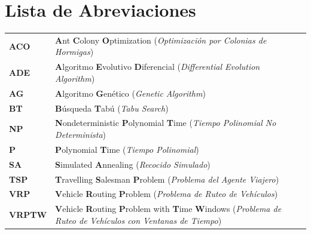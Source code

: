 \documentclass[12pt,titlepage,twoside,openright]{book}
\makeatletter
\def\cleardoublepage{\clearpage\if@twoside \ifodd\c@page\else
\hbox{}
\thispagestyle{empty}
\newpage
\if@twocolumn\hbox{}\newpage\fi\fi\fi}
\makeatother
\begin{document}

\setcounter{tocdepth}{3}
\setcounter{secnumdepth}{3}


\tableofcontents
\cleardoublepage
\listoffigures
{}
\cleardoublepage
\listoftables
{}
\cleardoublepage
\listofmyequations
{}
\cleardoublepage
\chapter*{Lista de Abreviaciones}

\vspace{0.5cm}
\begin{tabularx}{\textwidth}{>{\bfseries}l X}
	ACO   & \textbf{A}nt \textbf{C}olony \textbf{O}ptimization (\textit{Optimización por Colonias de Hormigas})                                                     \\
	ADE   & \textbf{A}lgoritmo \textbf{E}volutivo \textbf{D}iferencial (\textit{Differential Evolution Algorithm})                                                  \\
	AG    & \textbf{A}lgoritmo \textbf{G}enético (\textit{Genetic Algorithm})                                                                                    \\
	BT    & \textbf{B}úsqueda \textbf{T}abú (\textit{Tabu Search})                                                                                            \\
	NP    & \textbf{N}ondeterministic \textbf{P}olynomial \textbf{T}ime (\textit{Tiempo Polinomial No Determinista})                                                \\
	P     & \textbf{P}olynomial \textbf{T}ime (\textit{Tiempo Polinomial})                                                                                          \\
	SA    & \textbf{S}imulated \textbf{A}nnealing (\textit{Recocido Simulado})                                                                                      \\
	TSP   & \textbf{T}ravelling \textbf{S}alesman \textbf{P}roblem (\textit{Problema del Agente Viajero})                                                           \\
	VRP   & \textbf{V}ehicle \textbf{R}outing \textbf{P}roblem (\textit{Problema de Ruteo de Vehículos})                                                            \\
	VRPTW & \textbf{V}ehicle \textbf{R}outing \textbf{P}roblem with \textbf{T}ime \textbf{W}indows (\textit{Problema de Ruteo de Vehículos con Ventanas de Tiempo}) \\
\end{tabularx}
\end{document}
